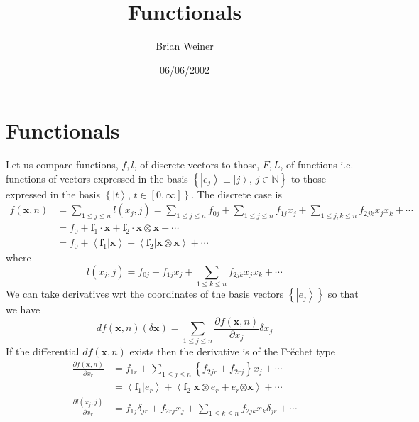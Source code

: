 \documentclass[aps,preprint]{revtex4}%
\begin{document}
\preprint{ }
\title[Functionals]{Functionals}
\author{Brian Weiner}
\date{06/06/2002}
\maketitle
\tableofcontents


\section{Functionals}

Let us compare functions, $f,l$, of discrete vectors to those, $F,L$, of
functions i.e. functions of vectors expressed in the basis $\left\{
\left\vert e_{j}\right\rangle \equiv\left\vert j\right\rangle ,\,j\in
\mathbb{N}\right\}  $ to those expressed in the basis $\left\{  \left\vert
t\right\rangle ,\,t\in\left[  0,\infty\right]  \right\}  $. The discrete case
is
\begin{align}
f\left(  \mathbf{x},n\right)   &  =\sum_{1\leq j\leq n}l\left(  x_{j}%
,j\right)  =\sum_{1\leq j\leq n}f_{0j}+\sum_{1\leq j\leq n}f_{1j}x_{j}%
+\sum_{1\leq j,k\leq n}f_{2jk}x_{j}x_{k}+\cdots\nonumber\\
&  =f_{0}+\mathbf{f}_{1}\cdot\mathbf{x+f}_{2}\cdot\mathbf{x\otimes x}%
+\cdots\nonumber\\
&  =f_{0}+\left\langle \mathbf{f}_{1}|\mathbf{x}\right\rangle +\left\langle
\mathbf{f}_{2}|\mathbf{x\otimes x}\right\rangle +\cdots
\end{align}
where%
\begin{equation}
l\left(  x_{j},j\right)  =f_{0j}+f_{1j}x_{j}+\sum_{1\leq k\leq n}f_{2jk}%
x_{j}x_{k}+\cdots
\end{equation}
We can take derivatives wrt the coordinates of the basis vectors $\left\{
\left\vert e_{j}\right\rangle \right\}  $ so that we have%
\begin{equation}
df\left(  \mathbf{x},n\right)  \left(  \delta\mathbf{x}\right)  =\sum_{1\leq
j\leq n}\frac{\partial f\left(  \mathbf{x},n\right)  }{\partial x_{j}}\delta
x_{j}%
\end{equation}
If the differential $df\left(  \mathbf{x},n\right)  $ exists then the
derivative is of the Fr\u{e}chet type
\begin{align}
\frac{\partial f\left(  \mathbf{x},n\right)  }{\partial x_{r}}  &
=f_{1r}+\sum_{1\leq j\leq n}\left\{  f_{2jr}+f_{2rj}\right\}  x_{j}%
+\cdots\nonumber\\
&  =\left\langle \mathbf{f}_{1}|e_{r}\right\rangle +\left\langle
\mathbf{f}_{2}|\mathbf{x\otimes}e_{r}+e_{r}\mathbf{\otimes x}\right\rangle
+\cdots\nonumber\\
\frac{\partial l\left(  x_{j},j\right)  }{\partial x_{r}}  &  =f_{1j}%
\delta_{jr}+f_{2rj}x_{j}+\sum_{1\leq k\leq n}f_{2jk}x_{k}\delta_{jr}+\cdots
\end{align}
\end{document}
